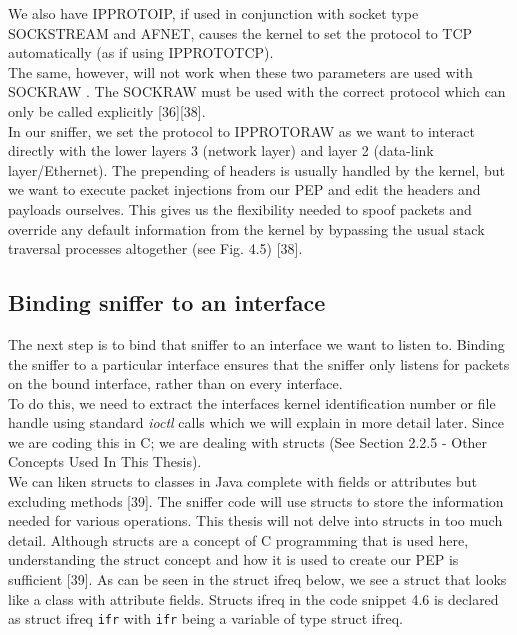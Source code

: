 \documentclass{uathesis}
\begin{document}
We also have IPPROTO\textunderscore IP, if used in conjunction with socket type SOCK\textunderscore STREAM and AF\textunderscore NET, causes the kernel to set the protocol to TCP automatically (as if using IPPROTO\textunderscore TCP). \\

The same, however, will not work when these two parameters are used with SOCK\textunderscore RAW . The SOCK\textunderscore RAW must be used with the correct protocol which can only be called explicitly [36][38].\\

In our sniffer, we set the protocol to IPPROTO\textunderscore RAW as we want to interact directly with the lower layers 3 (network layer) and layer 2 (data-link layer/Ethernet). The prepending of headers is usually handled by the kernel, but we want to execute packet injections from our PEP and edit the headers and payloads ourselves. This gives us the flexibility needed to spoof packets and override any default information from the kernel by bypassing the usual stack traversal processes altogether (see Fig. 4.5) [38].\\

\subsection{Binding sniffer to an interface}
The next step is to bind that sniffer to an interface we want to listen to. Binding the sniffer to a particular interface ensures that the sniffer only listens for packets on the bound interface, rather than on every interface. \\

To do this, we need to extract the interfaces kernel identification number or file handle using standard \emph{ioctl} calls which we will explain in more detail later. Since we are coding this in C; we are dealing with structs (See Section 2.2.5 - Other Concepts Used In This Thesis). \\

We can liken structs to classes in Java complete with fields or attributes but excluding methods [39]. The sniffer code will use structs to store the information needed for various operations. This thesis will not delve into structs in too much detail. Although structs are a concept of C programming that is used here, understanding the struct concept and how it is used to create our PEP is sufficient [39]. As can be seen in the struct ifreq below, we see a struct that looks like a class with attribute fields. Structs ifreq in the code snippet 4.6 is declared as struct ifreq {\tt ifr} with {\tt ifr} being a variable of type struct ifreq. \\
\end{document}
